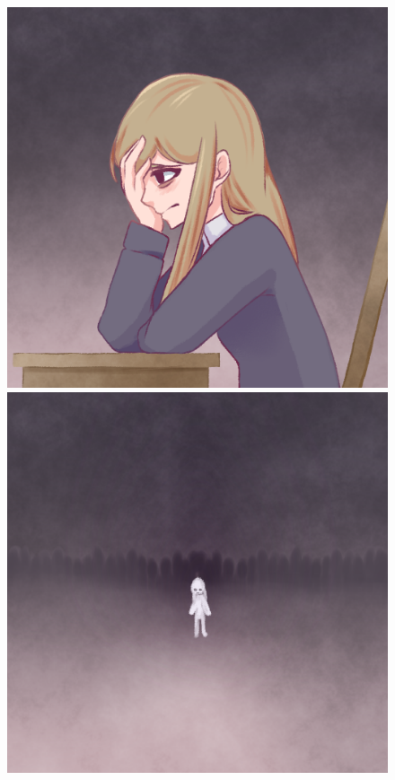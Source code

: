 \begin{figure}
    \centering
    \begin{minipage}{.3\textwidth}
        \includegraphics[width=\textwidth]{imgs/Memory1.png}
    \end{minipage}
    \begin{minipage}{.3\textwidth}
        \includegraphics[width=\textwidth]{imgs/Memory2.png}

\end{minipage}
\end{figure}
